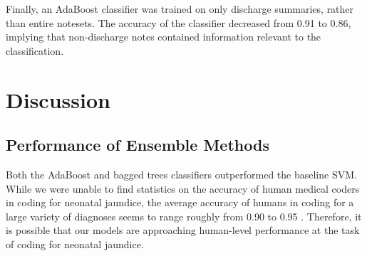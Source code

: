 \documentclass[conference]{IEEEtran}
\begin{document}
Finally, an AdaBoost classifier was trained on only discharge summaries, rather than entire notesets. The accuracy of the classifier decreased from 0.91 to 0.86, implying that non-discharge notes contained information relevant to the classification.
\section{Discussion}
\subsection{Performance of Ensemble Methods}
Both the AdaBoost and bagged trees classifiers outperformed the baseline SVM. While we were unable to find statistics on the accuracy of human medical coders in coding for neonatal jaundice, the average accuracy of humans in coding for a large variety of diagnoses seems to range roughly from 0.90 to 0.95 \cite{OMalley}. Therefore, it is possible that our models are approaching human-level performance at the task of coding for neonatal jaundice.
\end{document}
